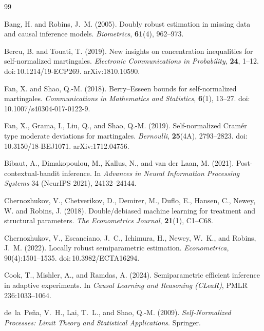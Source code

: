 \documentclass[11pt]{article}
\numberwithin{equation}{section}
\theoremstyle{plain}
\theoremstyle{definition}
\theoremstyle{remark}
\newcommand{\doi}[1]{doi:\,#1}
\newcommand{\arxiv}[1]{arXiv:#1}
\begin{document}
\iffalse
\begin{thebibliography}{99}

Bang, H. and Robins, J.~M. (2005).
Doubly robust estimation in missing data and causal inference models.
\emph{Biometrics}, \textbf{61}(4), 962--973.



Bercu, B. and Touati, T. (2019).
New insights on concentration inequalities for self-normalized martingales.
\emph{Electronic Communications in Probability}, \textbf{24}, 1--12. \doi{10.1214/19-ECP269}. \arxiv{1810.10590}.

Fan, X. and Shao, Q.-M. (2018).
Berry--Esseen bounds for self-normalized martingales.
\emph{Communications in Mathematics and Statistics}, \textbf{6}(1), 13--27. \doi{10.1007/s40304-017-0122-9}.

Fan, X., Grama, I., Liu, Q., and Shao, Q.-M. (2019).
Self-normalized Cram{\'e}r type moderate deviations for martingales.
\emph{Bernoulli}, \textbf{25}(4A), 2793--2823. \doi{10.3150/18-BEJ1071}. \arxiv{1712.04756}.

Bibaut, A., Dimakopoulou, M., Kallus, N., and van der Laan, M. (2021).
Post-contextual-bandit inference.
In \emph{Advances in Neural Information Processing Systems} 34 (NeurIPS 2021), 24132--24144.

Chernozhukov, V., Chetverikov, D., Demirer, M., Duflo, E., Hansen, C., Newey, W. and Robins, J. (2018).
Double/debiased machine learning for treatment and structural parameters.
\emph{The Econometrics Journal}, \textbf{21}(1), C1--C68.

Chernozhukov, V., Escanciano, J.~C., Ichimura, H., Newey, W.~K., and Robins, J.~M. (2022).
Locally robust semiparametric estimation.
\emph{Econometrica}, 90(4):1501--1535. \doi{10.3982/ECTA16294}.

Cook, T., Mishler, A., and Ramdas, A. (2024).
Semiparametric efficient inference in adaptive experiments.
In \emph{Causal Learning and Reasoning (CLeaR)}, PMLR 236:1033--1064.

de~la~Pe\~na, V.~H., Lai, T.~L., and Shao, Q.-M. (2009).
\emph{Self-Normalized Processes: Limit Theory and Statistical Applications}.
Springer.


\end{thebibliography}
\end{document}
